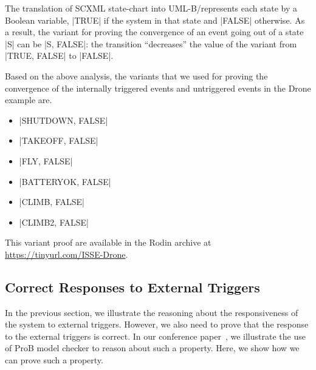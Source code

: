 The translation of SCXML state-chart into UML-B/\EventB represents each
state by a Boolean variable, |TRUE| if the system in that state and
|FALSE| otherwise. As a result, the variant for proving the convergence
of an event going out of a state |S| can be |{S, FALSE}|: the
transition ``decreases'' the value of the variant from |{TRUE, FALSE}|
to |FALSE|.

Based on the above analysis, the variants that we used for proving the
convergence of the internally triggered events and untriggered events
in the Drone example are.
\begin{itemize}
\item |{SHUTDOWN, FALSE}|

\item |{TAKEOFF, FALSE}|

\item |{FLY, FALSE}|

\item |{BATTERYOK, FALSE}|

\item |{CLIMB, FALSE}|

\item |{CLIMB2, FALSE}|
\end{itemize}

This variant proof are available in the Rodin archive at
\url{https://tinyurl.com/ISSE-Drone}.


\subsection{Correct Responses to External Triggers}
\label{sec:corr-resp-extern}
In the previous section, we illustrate the reasoning about the
responsiveness of the system to external triggers.  However, we also
need to prove that the response to the external triggers is correct.
In our conference paper~\cite{detect2020}, we illustrate the use of
ProB model checker to reason about such a property.  Here, we show how
we can prove such a property.


